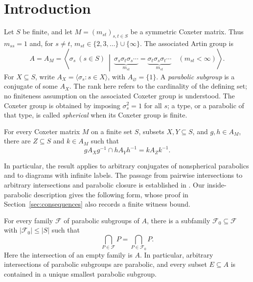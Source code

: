 \section{Introduction}
\label{sec:intro}

Let $S$ be finite, and let $M=(m_{st})_{s,t\in S}$ be a symmetric Coxeter
matrix. Thus $m_{ss}=1$ and, for $s\ne t$,
$m_{st}\in\{2,3,\ldots\}\cup\{\infty\}$. The associated Artin group is
\[
 A=A_M=\left\langle \sigma_s\ (s\in S)\ \middle|\
 \underbrace{\sigma_s\sigma_t\sigma_s\cdots}_{m_{st}}
 =\underbrace{\sigma_t\sigma_s\sigma_t\cdots}_{m_{st}}
 \quad(m_{st}<\infty)\right\rangle.
\]
For $X\subseteq S$, write $A_X=\langle\sigma_s:s\in X\rangle$, with
$A_\varnothing=\{1\}$. A \emph{parabolic subgroup} is a conjugate of
some $A_X$. The rank here refers to the cardinality of the defining set;
no finiteness assumption on the associated Coxeter group is understood.
The Coxeter group is obtained by imposing $\sigma_s^2=1$ for all $s$;
a type, or a parabolic of that type, is called \emph{spherical} when
its Coxeter group is finite.

\begin{theorem}
\label{thm:main}
For every Coxeter matrix $M$ on a finite set $S$, subsets $X,Y\subseteq S$, and
$g,h\in A_M$, there are $Z\subseteq S$ and $k\in A_M$ such that
\[
 gA_Xg^{-1}\cap hA_Yh^{-1}=kA_Zk^{-1}.
\]
\end{theorem}

In particular, the result applies to arbitrary conjugates of nonspherical
parabolics and to diagrams with infinite labels. The passage from pairwise intersections to arbitrary intersections and
parabolic closure is established in
\cite[Proposition~1.5 and Corollary~1.6]{MoellerParisVarghese2024}.
Our inside-parabolic description gives the following form, whose proof
in Section~\ref{sec:consequences} also records a finite witness bound.

\begin{corollary}
\label{cor:arbitrary-intersections}
For every family $\mathcal F$ of parabolic subgroups of $A$, there is a
subfamily $\mathcal F_0\subseteq\mathcal F$ with $|\mathcal F_0|\le |S|$ such
that
\[
 \bigcap_{P\in\mathcal F}P=\bigcap_{P\in\mathcal F_0}P.
\]
Here the intersection of an empty family is $A$. In particular, arbitrary
intersections of parabolic subgroups are parabolic, and every subset
$E\subseteq A$ is contained in a unique smallest parabolic subgroup.
\end{corollary}


